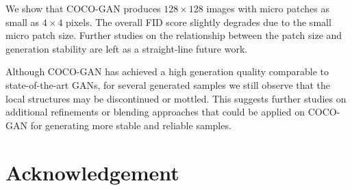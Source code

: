 \documentclass{article}
\newcommand{\modelName}{COCO-GAN }
\begin{document}
    We show that \modelName produces $128\times128$ images with micro patches as small as $4\times4$ pixels. The overall FID score slightly degrades due to the small micro patch size. Further studies on the relationship between the patch size and generation stability are left as a straight-line future work.
    
    Although \modelName has achieved a high generation quality comparable to state-of-the-art GANs, for several generated samples we still observe that the local structures may be discontinued or mottled. This suggests further studies on additional refinements or blending approaches that could be applied on \modelName for generating more stable and reliable samples.
    




    
     \section{Acknowledgement} 
\end{document}
